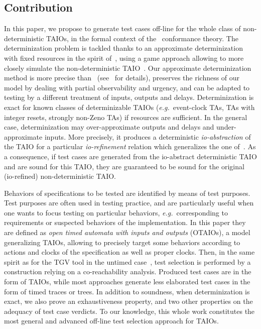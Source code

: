 \documentclass{LMCS}
\theoremstyle{plain}\newtheorem{proposition}[thm]{Proposition}
\def\eg{{\em e.g.}}
\begin{document}
\subsection*{Contribution} 
In this paper, we propose to generate test cases off-line for the whole class of
non-deterministic TAIOs, in the formal context of the \tioco\, conformance
theory.  The determinization problem is tackled thanks to an
approximate determinization with fixed resources in the spirit 
of~\cite{KrichenTripakis09}, using a game
approach allowing to more closely simulate the non-deterministic TAIO~\cite{BertrandStainerJeronKrichen-FOSSACS2011}.
Our approximate determinization method is more precise
than~\cite{KrichenTripakis09} (see~\cite{BertrandStainerJeronKrichen-FOSSACS2011,BertrandStainerJeronKrichen-RR2010} for details), preserves the richness of our model by dealing with partial
observability and urgency, and can be adapted to testing by  
a different treatment of inputs, outputs and delays.  
Determinization is exact for known classes of determinizable TAIOs
(\eg~event-clock TAs, TAs with integer resets, strongly non-Zeno TAs) if
resources are sufficient. 
In the general case, determinization may over-approximate outputs and delays
and under-approximate inputs.
More precisely, it produces a deterministic {\em io-abstraction} of the TAIO 
for a particular {\em io-refinement} relation
which generalizes the one of~\cite{David-Larsen-etal-HSCC10}.  
As a consequence, if test cases are
generated from the io-abstract deterministic TAIO and are sound
for this TAIO, they are guaranteed to be sound for
the original (io-refined) non-deterministic TAIO.


Behaviors of specifications to be tested are identified by means of test purposes. Test purposes are often used in testing practice, 
and are particularly useful when one wants to focus testing
on particular behaviors, \eg~corresponding to requirements 
or suspected behaviors of the implementation.
In this paper they are defined as {\em open timed automata with inputs and
  outputs} (OTAIOs), a model generalizing TAIOs, allowing to precisely
target some behaviors according to actions and clocks of the
specification as well as proper clocks.  
Then, 
in the same spirit as for the TGV tool in the untimed case~\cite{jard04a},  
test selection is performed by a construction relying 
on a co-reachability analysis. 
Produced test cases are in the form of TAIOs, 
while most approaches generate less elaborated 
test cases in the form of timed traces or trees.
In addition to soundness, 
when determinization is exact, 
we also prove an exhaustiveness property,
and two other properties on the adequacy of test case verdicts.
To our knowledge, this whole work constitutes the most general and
advanced off-line test selection approach for TAIOs.
\end{document}

